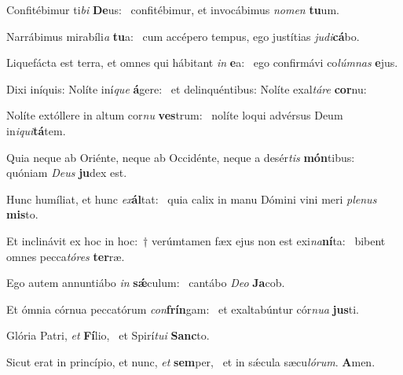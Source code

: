 \item Confitébimur ti\textit{bi} \textbf{De}us:~\psstar{} confitébimur, et invocábimus \textit{nomen} \textbf{tu}um.
\item Narrábimus mirabíli\textit{a} \textbf{tu}a:~\psstar{} cum accépero tempus, ego justítias \textit{judi}\textbf{cá}bo.
\item Liquefácta est terra, et omnes qui hábitant \textit{in} \textbf{e}a:~\psstar{} ego confirmávi co\textit{lúmnas} \textbf{e}jus.
\item Dixi iníquis: Nolíte iní\textit{que} \textbf{á}gere:~\psstar{} et delinquéntibus: Nolíte exal\textit{táre} \textbf{cor}nu:
\item Nolíte extóllere in altum cor\textit{nu} \textbf{ves}trum:~\psstar{} nolíte loqui advérsus Deum in\textit{iqui}\textbf{tá}tem.
\item Quia neque ab Oriénte, neque ab Occidénte, neque a desér\textit{tis} \textbf{món}tibus:~\psstar{} quóniam \textit{Deus} \textbf{ju}dex est.
\item Hunc humíliat, et hunc \textit{ex}\textbf{ál}tat:~\psstar{} quia calix in manu Dómini vini meri \textit{plenus} \textbf{mis}to.
\item Et inclinávit ex hoc in hoc:~† verúmtamen fæx ejus non est exi\textit{na}\textbf{ní}ta:~\psstar{} bibent omnes pecca\textit{tóres} \textbf{ter}ræ.
\item Ego autem annuntiábo \textit{in} \textbf{sǽ}culum:~\psstar{} cantábo \textit{Deo} \textbf{Ja}cob.
\item Et ómnia córnua peccatórum \textit{con}\textbf{frín}gam:~\psstar{} et exaltabúntur cór\textit{nua} \textbf{jus}ti.
\item Glória Patri, \textit{et} \textbf{Fí}lio,~\psstar{} et Spirí\textit{tui} \textbf{Sanc}to.
\item Sicut erat in princípio, et nunc, \textit{et} \textbf{sem}per,~\psstar{} et in sǽcula sæcu\textit{lórum}. \textbf{A}men.
